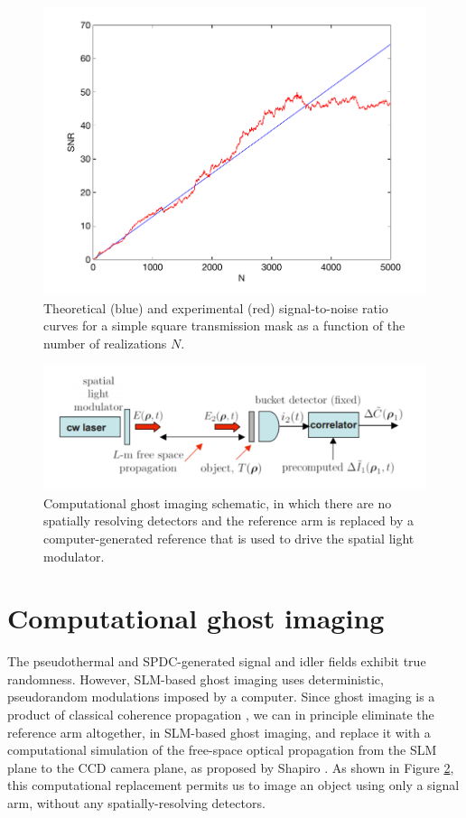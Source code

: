 \begin{figure}[htb]
\centerline{\includegraphics[width=12cm]{figure-ghost-snr.pdf}}
\caption{Theoretical (blue) and experimental (red) signal-to-noise ratio curves for a simple square transmission mask as a function of the number of realizations $N$.}
\label{figure:ghost-snr}
\end{figure}

\begin{figure}[htb]
\centerline{\includegraphics[width=12cm]{figure-ghost-computational-schematic.pdf}}
\caption{Computational ghost imaging schematic, in which there are no spatially resolving detectors and the reference arm is replaced by a computer-generated reference that is used to drive the spatial light modulator.}
\label{figure:ghost-computational-schematic}
\end{figure}

\section{Computational ghost imaging}

The pseudothermal and SPDC-generated signal and idler fields exhibit true randomness. However, SLM-based ghost imaging uses deterministic, pseudorandom modulations imposed by a computer. Since ghost imaging is a product of classical coherence propagation \cite{erkmen-unified}, we can in principle eliminate the reference arm altogether, in SLM-based ghost imaging, and replace it with a computational simulation of the free-space optical propagation from the SLM plane to the CCD camera plane, as proposed by Shapiro \cite{shapiro-computational,erkmen-from}. As shown in Figure \ref{figure:ghost-computational-schematic}, this computational replacement permits us to image an object using only a signal arm, without any spatially-resolving detectors.

